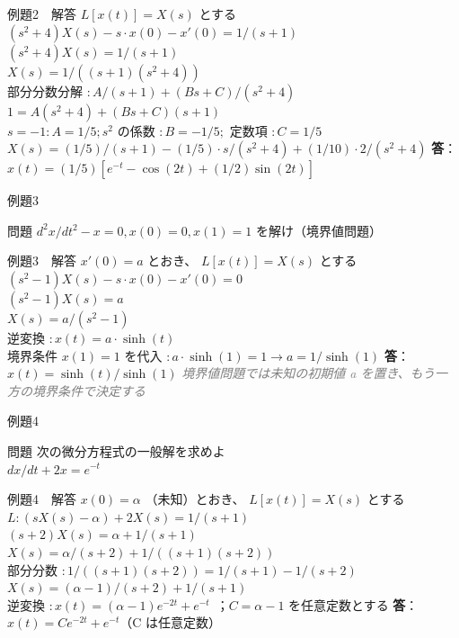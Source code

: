 \documentclass[professionalfonts]{beamer}
\begin{document}
\begin{frame}{例題2　解答}
  $L[x(t)] = X(s)$ とする\\[4pt]
  $(s^{2}+4)X(s) - s\cdot x(0) - x'(0) = 1/(s+1)$\\[4pt]
  $(s^{2}+4)X(s) = 1/(s+1)$\\[4pt]
  $X(s) = 1/((s+1)(s^{2}+4))$\\[4pt]
  部分分数分解 $: A/(s+1) + (Bs+C)/(s^{2}+4)$\\[4pt]
  $1 = A(s^{2}+4) + (Bs+C)(s+1)$\\[4pt]
  $s=-1: A = 1/5; s^{2}$ の係数 $: B = -1/5;$ 定数項 $: C = 1/5$\\[4pt]
  $X(s) = (1/5)/(s+1) - (1/5)\cdot s/(s^{2}+4) + (1/10)\cdot2/(s^{2}+4)$
  \medskip\textbf{答}：$x(t) = (1/5)[e^{-t} - \cos(2t) + (1/2)\sin(2t)]$
\end{frame}

\begin{frame}{例題3}
  \begin{exampleblock}{問題}
    $d^{2}x/dt^{2} - x = 0, x(0) = 0, x(1) = 1$ を解け（境界値問題）\\[2pt]
  \end{exampleblock}
\end{frame}

\begin{frame}{例題3　解答}
  $x'(0) = a$ とおき、 $L[x(t)] = X(s)$ とする\\[4pt]
  $(s^{2}-1)X(s) - s\cdot x(0) - x'(0) = 0$\\[4pt]
  $(s^{2}-1)X(s) = a$\\[4pt]
  $X(s) = a/(s^{2}-1)$\\[4pt]
  逆変換 $: x(t) = a\cdot \sinh(t)$\\[4pt]
  境界条件 $x(1) = 1$ を代入 $: a\cdot \sinh(1) = 1 \to a = 1/\sinh(1)$
  \medskip\textbf{答}：$x(t) = \sinh(t)/\sinh(1)$
  {\footnotesize \textcolor{gray}{\textit{境界値問題では未知の初期値 a を置き、もう一方の境界条件で決定する}}}
\end{frame}

\begin{frame}{例題4}
  \begin{exampleblock}{問題}
    次の微分方程式の一般解を求めよ\\[2pt]
    $dx/dt + 2x = e^{-t}$
  \end{exampleblock}
\end{frame}

\begin{frame}{例題4　解答}
  $x(0) = \alpha$ （未知）とおき、 $L[x(t)] = X(s)$ とする\\[4pt]
  $L: (sX(s) - \alpha) + 2X(s) = 1/(s+1)$\\[4pt]
  $(s+2)X(s) = \alpha + 1/(s+1)$\\[4pt]
  $X(s) = \alpha/(s+2) + 1/((s+1)(s+2))$\\[4pt]
  部分分数 $: 1/((s+1)(s+2)) = 1/(s+1) - 1/(s+2)$\\[4pt]
  $X(s) = (\alpha-1)/(s+2) + 1/(s+1)$\\[4pt]
  逆変換 $: x(t) = (\alpha-1)e^{-2t} + e^{-t}$\ ；$C = \alpha-1$ を任意定数とする
  \medskip\textbf{答}：$x(t) = Ce^{-2t} + e^{-t}$（C は任意定数）
\end{frame}
\end{document}
